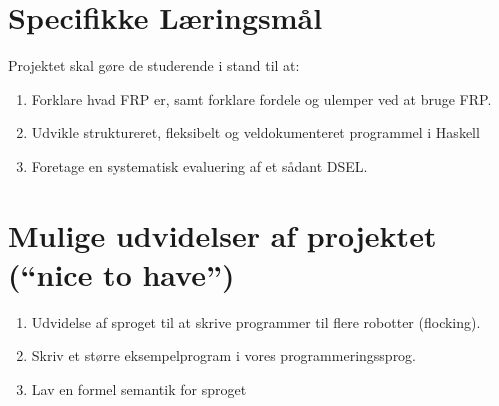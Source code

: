 \documentclass[a4paper,oneside, draft]{memoir}
\begin{document}
\section{Specifikke Læringsmål}

Projektet skal gøre de studerende i stand til at:

\begin{enumerate}

\item Forklare hvad FRP er, samt forklare fordele og ulemper ved at bruge FRP.

\item Udvikle struktureret, fleksibelt og veldokumenteret programmel i Haskell


\item Foretage en systematisk evaluering af et sådant DSEL. 

\end{enumerate}


\section{Mulige udvidelser af projektet ("`nice to have"')}
\begin{enumerate}

\item Udvidelse af sproget til at skrive programmer til flere robotter (flocking).

\item Skriv et større eksempelprogram i vores programmeringssprog.

\item Lav en formel semantik for sproget

\end{enumerate}
\end{document}
